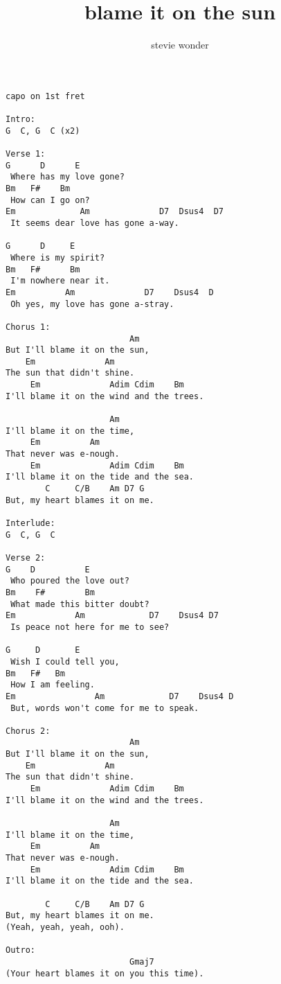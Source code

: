 \author{stevie wonder}
\title{blame it on the sun}
\maketitle
\begin{verbatim}
capo on 1st fret

Intro:
G  C, G  C (x2)

Verse 1:
G      D      E
 Where has my love gone?
Bm   F#    Bm
 How can I go on?
Em             Am              D7  Dsus4  D7
 It seems dear love has gone a-way.

G      D     E
 Where is my spirit?
Bm   F#      Bm
 I'm nowhere near it.
Em          Am              D7    Dsus4  D
 Oh yes, my love has gone a-stray.

Chorus 1:
                         Am
But I'll blame it on the sun,
    Em              Am
The sun that didn't shine.
     Em              Adim Cdim    Bm
I'll blame it on the wind and the trees.

                     Am
I'll blame it on the time,
     Em          Am
That never was e-nough.
     Em              Adim Cdim    Bm
I'll blame it on the tide and the sea.
        C     C/B    Am D7 G
But, my heart blames it on me.

Interlude:
G  C, G  C

Verse 2:
G    D          E
 Who poured the love out?
Bm    F#        Bm
 What made this bitter doubt?
Em            Am             D7    Dsus4 D7
 Is peace not here for me to see?

G     D       E
 Wish I could tell you,
Bm   F#   Bm
 How I am feeling.
Em                Am             D7    Dsus4 D
 But, words won't come for me to speak.

Chorus 2:
                         Am
But I'll blame it on the sun,
    Em              Am
The sun that didn't shine.
     Em              Adim Cdim    Bm
I'll blame it on the wind and the trees.

                     Am
I'll blame it on the time,
     Em          Am
That never was e-nough.
     Em              Adim Cdim    Bm
I'll blame it on the tide and the sea.

        C     C/B    Am D7 G
But, my heart blames it on me.
(Yeah, yeah, yeah, ooh).

Outro:
                         Gmaj7
(Your heart blames it on you this time).
\end{verbatim}